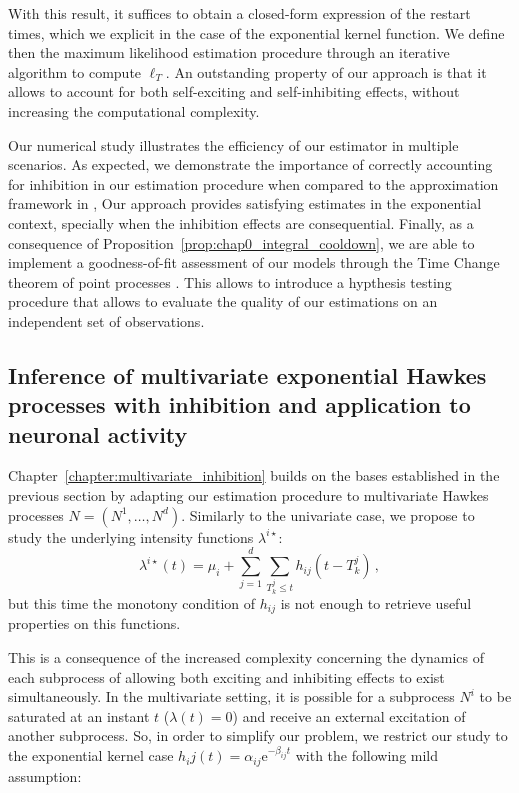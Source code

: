     With this result, it suffices to obtain a closed-form expression of the restart times, which we explicit in the case of the exponential kernel function.
    We define then the maximum likelihood estimation procedure through an iterative algorithm to compute $\ell_T$.
    An outstanding property of our approach is that it allows to account for both self-exciting and self-inhibiting effects, without increasing the computational complexity.

    Our numerical study illustrates the efficiency of our estimator in multiple scenarios.
    As expected, we demonstrate the importance of correctly accounting for inhibition in our estimation procedure when compared to the approximation framework in \textcite{Lemonnier2014}, 
    Our approach provides satisfying estimates in the exponential context, specially when the inhibition effects are consequential.
    Finally, as a consequence of Proposition~\ref{prop:chap0_integral_cooldown}, we are able to implement a goodness-of-fit assessment of our models through the Time Change theorem of point processes \parencite[Theorem 7.4.IV]{DaleyV1}.
    This allows to introduce a hypthesis testing procedure that allows to evaluate the quality of our estimations on an independent set of observations.





    \subsection{Inference of multivariate exponential Hawkes processes with inhibition and application to neuronal activity}
    Chapter~\ref{chapter:multivariate_inhibition} builds on the bases established in the previous section by adapting our estimation procedure to multivariate Hawkes processes $N = (N^1, \ldots, N^d)$.
    Similarly to the univariate case, we propose to study the underlying intensity functions $\lambda^{i\star}$:
    \[\lambda^{i\star}(t) = \mu_i + \sum_{j=1}^{d}\sum_{T_k^j \leq t}{h_{ij}(t-T_k^j)}\,,\]
    but this time the monotony condition of $h_{ij}$ is not enough to retrieve useful properties on this functions.

    This is a consequence of the increased complexity concerning the dynamics of each subprocess of allowing both exciting and inhibiting effects to exist simultaneously.
    In the multivariate setting, it is possible for a subprocess $N^i$ to be saturated at an instant $t$ ($\lambda(t)=0$) and receive an external excitation of another subprocess.
    So, in order to simplify our problem, we restrict our study to the exponential kernel case $h_ij(t) = \alpha_{ij}\mathrm{e}^{-\beta_{ij} t}$ with the following mild assumption:


